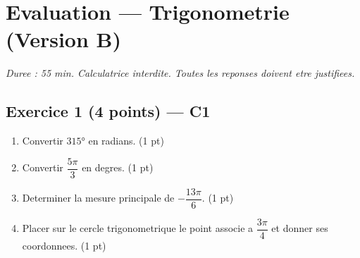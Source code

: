 

\section*{Evaluation — Trigonometrie (Version B)}
\textit{Duree : 55 min. Calculatrice interdite. Toutes les reponses doivent etre justifiees.}

\bigskip

\subsection*{Exercice 1 \hfill (4 points) — C1}

\begin{enumerate}
  \item Convertir $315°$ en radians. \hfill (1 pt)
  \item Convertir $\dfrac{5\pi}{3}$ en degres. \hfill (1 pt)
  \item Determiner la mesure principale de $-\dfrac{13\pi}{6}$. \hfill (1 pt)
  \item Placer sur le cercle trigonometrique le point associe a $\dfrac{3\pi}{4}$ et donner ses coordonnees. \hfill (1 pt)
\end{enumerate}

